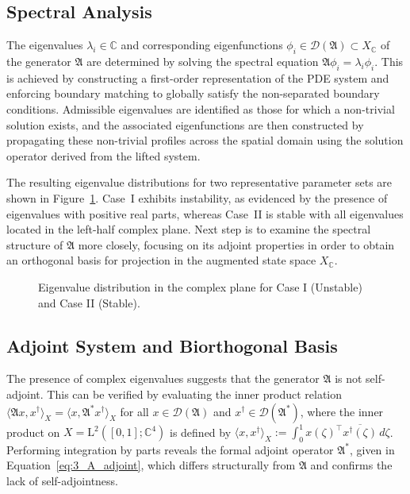 \subsection{Spectral Analysis} \label{sec:3_3_2_spectral_analysis}

The eigenvalues $\lambda_i \in \mathbb{C}$ and corresponding eigenfunctions $\phi_i \in \mathcal{D}(\mathfrak{A}) \subset X_\mathbb{C}$ of the generator $\mathfrak{A}$ are determined by solving the spectral equation $\mathfrak{A} \phi_i = \lambda_i \phi_i$. This is achieved by constructing a first-order representation of the PDE system and enforcing boundary matching to globally satisfy the non-separated boundary conditions. Admissible eigenvalues are identified as those for which a non-trivial solution exists, and the associated eigenfunctions are then constructed by propagating these non-trivial profiles across the spatial domain using the solution operator derived from the lifted system.

The resulting eigenvalue distributions for two representative parameter sets are shown in Figure~\ref{fig:3_eigvals}. Case~I exhibits instability, as evidenced by the presence of eigenvalues with positive real parts, whereas Case~II is stable with all eigenvalues located in the left-half complex plane. Next step is to examine the spectral structure of $\mathfrak{A}$ more closely, focusing on its adjoint properties in order to obtain an orthogonal basis for projection in the augmented state space $X_\mathbb{C}$.

\begin{figure}[!htbp]
    \centering
    
    \caption{Eigenvalue distribution in the complex plane for Case I (Unstable) and Case II (Stable).}
    \label{fig:3_eigvals}
\end{figure}

\subsection{Adjoint System and Biorthogonal Basis} \label{sec:3_3_3_adjoint}

The presence of complex eigenvalues suggests that the generator $\mathfrak{A}$ is not self-adjoint. This can be verified by evaluating the inner product relation $\langle \mathfrak{A} x, x^\dagger \rangle_X = \langle x, \mathfrak{A}^* x^\dagger \rangle_X$ for all $x \in \mathcal{D}(\mathfrak{A})$ and $x^\dagger \in \mathcal{D}(\mathfrak{A}^*)$, where the inner product on $X = \mathrm{L}^2([0,1]; \mathbb{C}^4)$ is defined by $\langle x, x^\dagger \rangle_X := \int_0^1 x(\zeta)^\top \overline{x^\dagger(\zeta)}\, d\zeta$. Performing integration by parts reveals the formal adjoint operator $\mathfrak{A}^*$, given in Equation~\eqref{eq:3_A_adjoint}, which differs structurally from $\mathfrak{A}$ and confirms the lack of self-adjointness.

